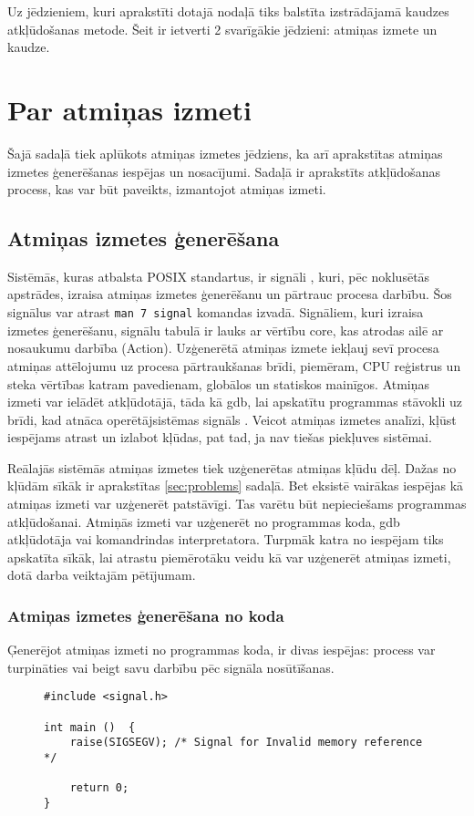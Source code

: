 ﻿Uz jēdzieniem, kuri aprakstīti dotajā nodaļā tiks balstīta izstrādājamā kaudzes atkļūdošanas metode.
Šeit ir ietverti 2 svarīgākie jēdzieni: atmiņas izmete un kaudze.

 \section{Par atmiņas izmeti}
 Šajā sadaļā tiek aplūkots atmiņas izmetes jēdziens, ka arī aprakstītas atmiņas izmetes ģenerēšanas iespējas un nosacījumi.
Sadaļā ir aprakstīts atkļūdošanas process, kas var būt paveikts, izmantojot atmiņas izmeti.

 \subsection{Atmiņas izmetes ģenerēšana}
Sistēmās, kuras atbalsta POSIX standartus, ir signāli \cite{USP}, kuri, pēc noklusētās apstrādes, izraisa atmiņas izmetes ģenerēšanu un pārtrauc procesa darbību. 
Šos signālus var atrast  \texttt{man 7 signal} komandas izvadā. 
Signāliem, kuri izraisa izmetes ģenerēšanu, signālu tabulā \cite{signal} ir lauks ar vērtību core, kas atrodas ailē ar nosaukumu darbība (Action). 
Uzģenerētā atmiņas izmete iekļauj sevī procesa atmiņas attēlojumu uz procesa pārtraukšanas brīdi, piemēram, CPU reģistrus un steka vērtības katram pavedienam, globālos un statiskos mainīgos. 
Atmiņas izmeti var ielādēt atkļūdotājā, tāda kā gdb, lai  apskatītu programmas stāvokli uz brīdi, kad atnāca operētājsistēmas signāls \cite{core}.
Veicot atmiņas izmetes analīzi, kļūst iespējams atrast un izlabot kļūdas, pat tad, ja nav tiešas piekļuves sistēmai. 

Reālajās sistēmās atmiņas izmetes tiek uzģenerētas atmiņas kļūdu dēļ. 
Dažas no kļūdām sīkāk ir aprakstītas \ref{sec:problems} sadaļā. 
Bet eksistē vairākas iespējas kā atmiņas izmeti var uzģenerēt patstāvīgi.
Tas varētu būt nepieciešams programmas atkļūdošanai.
Atmiņās izmeti var uzģenerēt no programmas koda,  gdb atkļūdotāja vai komandrindas interpretatora.
Turpmāk katra no iespējam tiks apskatīta sīkāk, lai atrastu piemērotāku veidu kā var uzģenerēt atmiņas izmeti, dotā darba veiktajām pētījumam.

\subsubsection{Atmiņas izmetes ģenerēšana no koda}
Ģenerējot atmiņas izmeti no programmas koda, ir divas iespējas: process var turpināties vai beigt savu darbību pēc signāla nosūtīšanas.
\begin{figure}[h]
\begin{lstlisting}
#include <signal.h>

int main ()  {
    raise(SIGSEGV); /* Signal for Invalid memory reference */
	
    return 0;
}
\end{lstlisting}
\caption{\textbf{\fontsize{11}{12}\selectfont {Atmiņas izmetes ģenerēšana, pārtraucot procesa darbību}}}
\end{figure}

